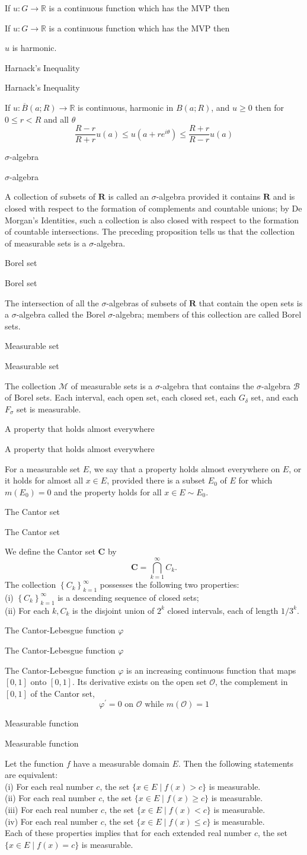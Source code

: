 \documentclass[17pt]{extarticle}
\renewcommand{\bar}[1]{\overline{#1}}
\newcommand{\boxset}[2]{\begin{mdframed}[style=darkQuesion]
#1
\end{mdframed}
\newpage
\begin{mdframed}[style=darkQuesion]
#1
  \end{mdframed}
\begin{mdframed}[style=darkAnswer]
#2
  \end{mdframed}
  \newpage
}
\begin{document}
\boxset{If $u: G \rightarrow \mathbb{R}$ is a continuous function which has the MVP then}
{$u$ is harmonic.}

\boxset{Harnack's Inequality}
{If $u: \bar{B}(a ; R) \rightarrow \mathbb{R}$ is continuous, harmonic in $B(a ; R)$, and $u \geq 0$ then for $0 \leq r<R$ and all $\theta$
$$
\frac{R-r}{R+r} u(a) \leq u\left(a+r e^{i \theta}\right) \leq \frac{R+r}{R-r} u(a)
$$
}

\boxset{$\sigma$-algebra}
{
A collection of subsets of $\mathbf{R}$ is called an $\sigma$-algebra provided it contains $\mathbf{R}$ and is closed with respect to the formation of complements and countable unions; by De Morgan's Identities, such a collection is also closed with respect to the formation of countable intersections. The preceding proposition tells us that the collection of measurable sets is a $\sigma$-algebra.
}
\boxset{Borel set}
{
The intersection of all the $\sigma$-algebras of subsets of $\mathbf{R}$ that contain the open sets is a $\sigma$-algebra called the Borel $\sigma$-algebra; members of this collection are called Borel sets.
}
\boxset{Measurable set}
{
The collection $\mathcal{M}$ of measurable sets is a $\sigma$-algebra that contains the $\sigma$-algebra $\mathcal{B}$ of Borel sets. Each interval, each open set, each closed set, each $G_{\delta}$ set, and each $F_{\sigma}$ set is measurable.
}
\boxset{A property that holds almost everywhere}
{
For a measurable set $E$, we say that a property holds almost everywhere on $E$, or it holds for almost all $x \in E$, provided there is a subset $E_{0}$ of $E$ for which $m\left(E_{0}\right)=0$ and the property holds for all $x \in E \sim E_{0}$.
}
\boxset{The Cantor set}
{
We define the Cantor set $\mathbf{C}$ by
$$
\mathbf{C}=\bigcap_{k=1}^{\infty} C_{k} .
$$
The collection $\left\{C_{k}\right\}_{k=1}^{\infty}$ possesses the following two properties:\[\ \]
(i) $\left\{C_{k}\right\}_{k=1}^{\infty}$ is a descending sequence of closed sets;\[\ \]
(ii) For each $k, C_{k}$ is the disjoint union of $2^{k}$ closed intervals, each of length $1 / 3^{k}$.
}
\boxset{The Cantor-Lebesgue function $\varphi$}
{
The Cantor-Lebesgue function $\varphi$ is an increasing continuous function that maps $[0,1]$ onto $[0,1]$. Its derivative exists on the open set $\mathcal{O}$, the complement in $[0,1]$ of the Cantor set,
$$
\varphi^{\prime}=0 \text { on } \mathcal{O} \text { while } m(\mathcal{O})=1
$$
}
\boxset{Measurable function}
{
Let the function $f$ have a measurable domain $E$. Then the following statements are equivalent:\[\ \]
(i) For each real number $c$, the set $\{x \in E \mid f(x)>c\}$ is measurable.\[\ \]
(ii) For each real number $c$, the set $\{x \in E \mid f(x) \geq c\}$ is measurable.\[\ \]
(iii) For each real number $c$, the set $\{x \in E \mid f(x)<c\}$ is measurable.\[\ \]
(iv) For each real number $c$, the set $\{x \in E \mid f(x) \leq c\}$ is measurable.\[\ \]
Each of these properties implies that for each extended real number $c$, the set $\{x \in E \mid f(x)=c\}$ is measurable.
}
\end{document}
